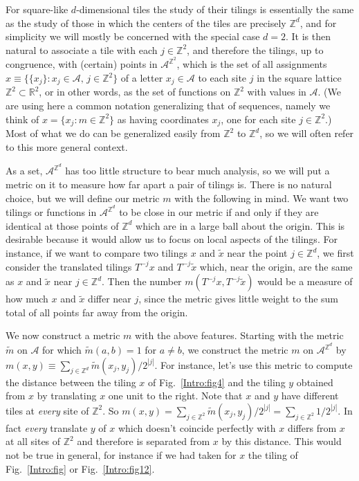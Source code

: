 \documentclass[reqno]{stml-l}
\theoremstyle{plain}
\theoremstyle{definition}
\numberwithin{equation}{chapter}
\begin{document}
For square-like $d$-dimensional tiles the study of their
tilings is essentially the same as the study of those in
which the centers of the tiles are precisely
$\mathbb{Z}^{d}$, and for simplicity we will mostly be
concerned with the special case $d=2$. It is then natural
to associate a tile with each $j\in \mathbb{Z}^{2}$, and
therefore the tilings, up to congruence, with (certain)
points in $\mathcal{A}^{\mathbb{Z}^{2}}$, which is the set
of all assignments $x\equiv\{\{x_{j}\}:x_{j}\in
\mathcal{A},\,j\in \mathbb{Z}^{2}\}$ of a letter $x_{j}\in
\mathcal{A}$ to each site $j$ in the square lattice
$\mathbb{Z}^{2}\subset \mathbb{R}^{2}$, or in other words,
as the set of functions on $\mathbb{Z}^{2}$ with values in
$\mathcal{A}$. (We are using here a common notation
generalizing that of sequences, namely we think of
$x=\{x_{j}:m\in \mathbb{Z}^{2}\}$ as having coordinates
$x_{j}$, one for each site $j\in \mathbb{Z}^{2}$.) Most of
what we do can be generalized easily from $\mathbb{Z}^{2}$
to $\mathbb{Z}^{d}$, so we will often refer to this more
general context.

As a set,
$\mathcal{A}^{\mathbb{Z}^{d}}$
has too little structure to bear much analysis, so we will
put a metric on it to measure how far apart a pair of
tilings is. There is no natural choice, but we will define
our metric $m$ with the following in mind. We want two
tilings or functions in $\mathcal{A}^{\mathbb{Z}^{d}}$ to
be close in our metric if and only if they are identical at
those points of $\mathbb{Z}^{d}$ which are in a large ball
about the origin. This is desirable because it would allow
us to focus on local aspects of the tilings. For instance,
if we want to compare two tilings $x$ and $\tilde{x}$ near
the point $j\in \mathbb{Z}^{d}$, we first consider the
translated tilings $T^{-j}x$ and $T^{-j}\tilde{x}$ which,
near the origin, are the same as $x$ and $\tilde{x}$ near
$j\in \mathbb{Z}^{d}$. Then the number $m(T^{-j}x,
T^{-j}\tilde{x})$ would be a measure of how much $x$ and
$\tilde{x}$ differ near $j$, since the metric gives little
weight to the sum total of all points far away from the
origin.

We now construct a metric $m$ with the above features.
Starting with the metric $\tilde{m}$ on $\mathcal{A}$ for
which $\tilde{m}(a, b)=1$ for $a\neq b$, we construct the
metric $m$ on $\mathcal{A}^{\mathbb{Z}^{d}}$ by $m(x,
y)\equiv\sum\nolimits_{j\in \mathbb{Z}^{d}}\tilde{m}(x_{j},
y_{j})/2^{|j|}$. For instance, let's use this metric to
compute the distance between the tiling $x$ of
Fig.~\ref{Intro:fig4} and the tiling $y$ obtained from $x$
by translating $x$ one unit to the right. Note that $x$ and
$y$ have different tiles at \emph{every} site of
$\mathbb{Z}^{2}$. So $m(x, y)=\sum\nolimits_{j\in
\mathbb{Z}^{2}}\tilde{m}(x_{j},
y_{j})/2^{|j|}=\sum\nolimits_{j\in
\mathbb{Z}^{2}}1/2^{|j|}$. In fact \emph{every} translate
$y$ of $x$ which doesn't coincide perfectly with $x$
differs from $x$ at all sites of $\mathbb{Z}^{2}$ and
therefore is separated from $x$ by this distance. This
would not be true in general, for instance if we had taken
for $x$ the tiling of Fig.~\ref{Intro:fig} or
Fig.~\ref{Intro:fig12}.
\end{document}
